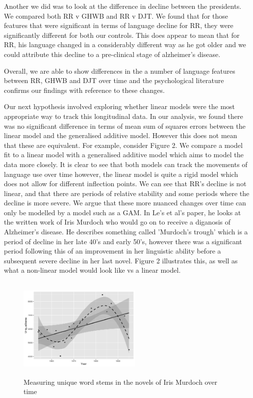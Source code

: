 \documentclass[12pt]{article}
\begin{document}
\par 
Another we did was to look at the difference in decline between the presidents. We compared both RR v GHWB and RR v DJT. We found that for those features that were significant in terms of language decline for RR, they were significantly different for both our controls. This does appear to mean that for RR, his language changed in a considerably different way as he got older and we could attribute this decline to a pre-clinical stage of alzheimer's disease.
\par
Overall, we are able to show differences in the a number of language features between RR, GHWB and DJT over time and the psychological literature confirms our findings with reference to these changes.
\par
Our next hypothesis involved exploring whether linear models were the most appropriate way to track this longitudinal data. In our analysis, we found there was no significant difference in terms of mean sum of squares errors between the linear model and the generalised additive model. However this does not mean that these are equivalent. For example, consider Figure 2. We compare a model fit to a linear model with a generalised additive model which aims to model the data more closely. It is clear to see that both models can track the movements of language use over time however, the linear model is quite a rigid model which does not allow for different inflection points. We can see that RR's decline is not linear, and that there are periods of relative stability and some periods where the decline is more severe. We argue that these more nuanced changes over time can only be modelled by a model such as a GAM. In Le's et al's paper, he looks at the written work of Iris Murdoch who would go on to receive a diganosis of Alzheimer's disease. He describes something called 'Murdoch's trough' which is a period of decline in her late 40's and early 50's, however there was a significant period following this of an improvement in her linguistic ability before a subsequent severe decline in her last novel. Figure 2 illustrates this, as well as what a non-linear model would look like vs a linear model.
\begin{figure}[H]
	\centering
	\includegraphics[width=6cm, height=5cm]{plots/IMStems.png}
	\caption{Measuring unique word stems in the novels of Iris Murdoch over time}
\end{figure}
\end{document}
